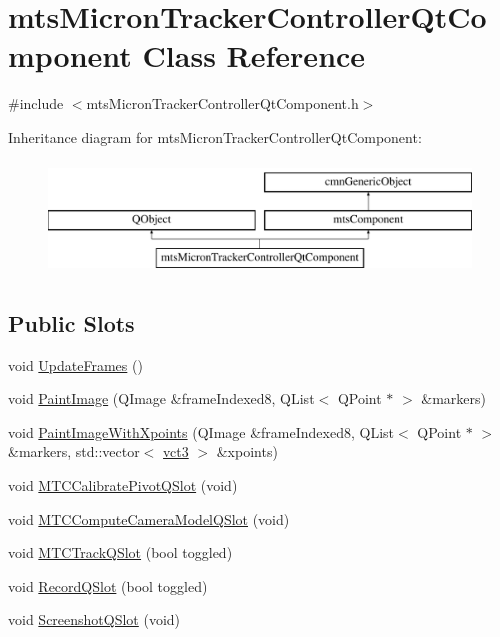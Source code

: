 \hypertarget{classmts_micron_tracker_controller_qt_component}{\section{mts\-Micron\-Tracker\-Controller\-Qt\-Component Class Reference}
\label{classmts_micron_tracker_controller_qt_component}
}


{\ttfamily \#include $<$mts\-Micron\-Tracker\-Controller\-Qt\-Component.\-h$>$}

Inheritance diagram for mts\-Micron\-Tracker\-Controller\-Qt\-Component\-:\begin{figure}[H]
\begin{center}
\leavevmode
\includegraphics[height=3.000000cm]{d5/d03/classmts_micron_tracker_controller_qt_component}
\end{center}
\end{figure}
\subsection*{Public Slots}
\begin{DoxyCompactItemize}
\item 
void \hyperlink{classmts_micron_tracker_controller_qt_component_af3659dd1929cbf9e4c29f5523b932808}{Update\-Frames} ()
\item 
void \hyperlink{classmts_micron_tracker_controller_qt_component_a032e41bba072daf42260c3a60f2a5cac}{Paint\-Image} (Q\-Image \&frame\-Indexed8, Q\-List$<$ Q\-Point $\ast$ $>$ \&markers)
\item 
void \hyperlink{classmts_micron_tracker_controller_qt_component_ac556c6d8147a702ce23df9b134a3f6a6}{Paint\-Image\-With\-Xpoints} (Q\-Image \&frame\-Indexed8, Q\-List$<$ Q\-Point $\ast$ $>$ \&markers, std\-::vector$<$ \hyperlink{vct_fixed_size_vector_types_8h_a3af82acdbf4eeb73c551909240b106ea}{vct3} $>$ \&xpoints)
\item 
void \hyperlink{classmts_micron_tracker_controller_qt_component_a648e184aaaa06b0e5900539b43cffa94}{M\-T\-C\-Calibrate\-Pivot\-Q\-Slot} (void)
\item 
void \hyperlink{classmts_micron_tracker_controller_qt_component_a0cfa5816fdd883e2eeed1f67d412b092}{M\-T\-C\-Compute\-Camera\-Model\-Q\-Slot} (void)
\item 
void \hyperlink{classmts_micron_tracker_controller_qt_component_a66528ff13d9bceff414f6470bd7a32cd}{M\-T\-C\-Track\-Q\-Slot} (bool toggled)
\item 
void \hyperlink{classmts_micron_tracker_controller_qt_component_a474618f51b5d7d9c85569c3b0491c8dd}{Record\-Q\-Slot} (bool toggled)
\item 
void \hyperlink{classmts_micron_tracker_controller_qt_component_a60304e6ce11bb9b7a529ffaeaac42c38}{Screenshot\-Q\-Slot} (void)
\end{DoxyCompactItemize}
